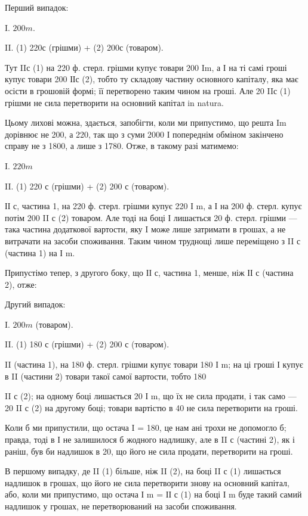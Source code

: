 Перший випадок:

I.    $200m$.

II. (1) 220с (грішми) + (2) 200с (товаром).

Тут IIс (1) на 220 ф. стерл. грішми купує товари 200 Im, а І на
ті самі гроші купує товари 200 ІІс (2), тобто ту складову частину
основного капіталу, яка має осісти в грошовій формі; її перетворено
таким чином на гроші. Але 20 IIс (1) грішми не сила перетворити на
основний капітал in natura.

Цьому лихові можна, здається, запобігти, коли ми припустимо, що решта
Im дорівнює не 200, а 220, так що з суми 2000 І попереднім обміном закінчено
справу не з 1800, а лише з 1780. Отже, в такому разі матимемо:

I.    $220 m$

II. (1) 220 с (грішми) + (2) 200 с (товаром).

ІІ с, частина 1, на 220 ф. стерл. грішми купує 220 І m, а І на
200 ф. стерл. купує потім 200 II с (2) товаром. Але тоді на боці І
лишається 20 ф. стерл. грішми — така частина додаткової вартости, яку
I може лише затримати в грошах, а не витрачати на засоби споживання.
Таким чином труднощі лише переміщено з II с (частина 1) на І m.

Припустімо тепер, з другого боку, що ІІ с, частина 1, менше, ніж ІІ с
(частина 2), отже:

Другий випадок:

I.    $200 m$ (товаром).

II. (1) 180 с (грішми) + (2) 200 с (товаром).

II (частина 1), на 180 ф. стерл. грішми купує товари 180 І m; на ці
гроші І купує в II (частини 2) товари такої самої вартости, тобто 180

II    с (2); на одному боці лишається 20 І m, що їх не сила продати, і так
само — 20 II с (2) на другому боці; товари вартістю в 40 не сила перетворити
на гроші.

Коли б ми припустили, що остача I = 180, це нам ані трохи не допомогло
б; правда, тоді в І не залишилося б жодного надлишку, але в II с
(частині 2), як і раніш, був би надлишок в 20, що його не сила продати,
перетворити на гроші.

В першому випадку, де II (1) більше, ніж II (2), на боці II с (1)
лишається надлишок в грошах, що його не сила перетворити знову на
основний капітал, або, коли ми припустимо, що остача І m = ІІ с (1) на
боці І m буде такий самий надлишок у грошах, не перетворюваний на
засоби споживання.

